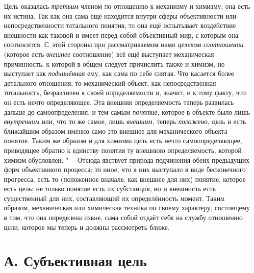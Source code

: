 Цель оказалась
{\em третьим} членом по
отношению к механизму и химизму; она есть их истина. Так как она сама ещё
находится внутри сферы объективности или непосредственности тотального
понятия, то она ещё испытывает воздействие внешности как таковой и имеет
перед собой объективный мир, с которым она соотносится. С~этой стороны при
рассматриваемом нами {\em целевом
соотношении} (которое есть
{\em внешнее}
соотношение) всё ещё выступает механическая причинность, к
которой в общем следует причислить также и химизм, но выступает как
{\em подчинённая} ему,
как сама по себе снятая. Что касается более детального отношения, то
механический объект, как непосредственная тотальность, безразличен к своей
определяемости и, значит, и к тому факту, что он есть нечто определяющее.
Эта внешняя определяемость теперь развилась дальше до самоопределения, и
тем самым {\em понятие,}
которое в объекте было лишь
{\em внутренним} или, что
то же самое, лишь {\em внешним,}
теперь {\em положено;}
цель и есть ближайшим образом именно само это внешнее для
механического объекта понятие. Таким же образом и для химизма цель есть
нечто самоопределяющее, приводящее обратно к единству понятия ту внешнюю
определяемость, которой химизм обусловлен. "--- Отсюда явствует
природа подчинения обеих предыдущих форм объективного процесса; то иное, чт\'{о}
 в них выступало в виде бесконечного прогресса, есть то (положенное
вначале, как внешнее для них) понятие, которое есть цель; не только понятие
есть их субстанция, но и внешность есть существенный для них, составляющий
их определённость момент. Таким образом, механическая или
химическая техника по своему характеру, состоящему в том, что она
определена извне, сама собой отдаёт себя на службу отношению цели, которое
мы теперь и должны рассмотреть ближе.

\section[А. Субъективная цель]{А. Субъективная цель}

